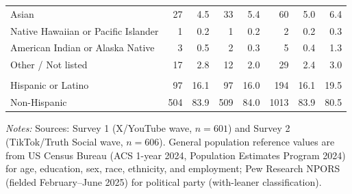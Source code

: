 \begin{table}[!h]
\begin{threeparttable}
\begin{tabular}[t]{lrrrrrrr}
\hspace{1em}Asian & 27 & 4.5 & 33 & 5.4 & 60 & 5.0 & 6.4\\
\hspace{1em}Native Hawaiian or Pacific Islander & 1 & 0.2 & 1 & 0.2 & 2 & 0.2 & 0.3\\
\hspace{1em}American Indian or Alaska Native & 3 & 0.5 & 2 & 0.3 & 5 & 0.4 & 1.3\\
\hspace{1em}Other / Not listed & 17 & 2.8 & 12 & 2.0 & 29 & 2.4 & 3.0\\
\addlinespace[0.3em]
\multicolumn{8}{l}{\textbf{Ethnicity}}\\
\hspace{1em}Hispanic or Latino & 97 & 16.1 & 97 & 16.0 & 194 & 16.1 & 19.5\\
\hspace{1em}Non-Hispanic & 504 & 83.9 & 509 & 84.0 & 1013 & 83.9 & 80.5\\
\bottomrule
\end{tabular}
\begin{tablenotes}
\footnotesize
\item \textit{Notes:} Sources: Survey 1 (X/YouTube wave, $n = 601$) and Survey 2 (TikTok/Truth Social wave, $n = 606$). General population reference values are from US Census Bureau (ACS 1-year 2024, Population Estimates Program 2024) for age, education, sex, race, ethnicity, and employment; Pew Research NPORS (fielded February--June 2025) for political party (with-leaner classification).
\end{tablenotes}
\end{threeparttable}
\end{table}
